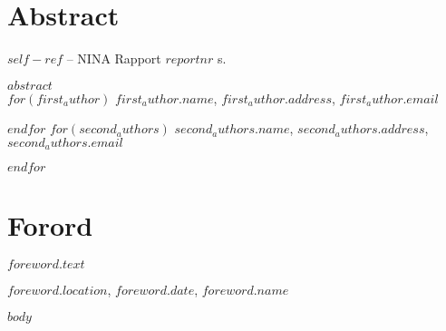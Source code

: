 \documentclass[11pt, a4paper]{article}
\begin{document}
\setcounter{secnumdepth}{0}
\section{Abstract}


\footnotesize{$self-ref$} – NINA Rapport $reportnr$ \pageref{LastPage} s.\par
\vspace{0.5cm}
\normalsize{
$abstract$} \\

\vspace{1cm}
\small
$for(first_author)$
$first_author.name$, $first_author.address$, $first_author.email$  \par
$endfor$
$for(second_authors)$
$second_authors.name$, $second_authors.address$, $second_authors.email$  \par
$endfor$
\normalsize
\clearpage


\doublespacing
\tableofcontents
{}
\singlespacing
\clearpage

\section{Forord}

\normalsize
$foreword.text$\par
\medskip
$foreword.location$, $foreword.date$, $foreword.name$



\clearpage
\setcounter{secnumdepth}{4}
\setlength{\parskip}{6pt}

$body$


\end{document}
